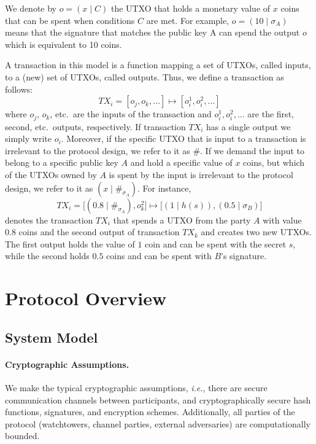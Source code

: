 \documentclass[runningheads]{llncs}
\newcommand{\ie}{{\em i.e.}}
\begin{document}
We denote by $o=(x \mid C)$
the UTXO that holds a monetary value of $x$ coins that can be spent when conditions $C$ are met. For example, $o=  (10 \mid \sigma_A)$ means that the signature that matches the public key A can spend the output $o$ which is equivalent to 10 coins.

A transaction in this model is a function mapping a set of UTXOs, called inputs, to a (new) set of UTXOs, called outputs.
Thus, we define a transaction as follows: 
$$TX_i= [o_j, o_k, \dots] \mapsto [o_i^1, o_i^2, \dots] $$
where $o_j$, $o_k$, etc.\ are the inputs of the transaction and $o_i^1, o_i^2, \dots $ are the first, second, etc.\ outputs, respectively.
If transaction $TX_i$ has a single output we simply write $o_i$.
Moreover, if the specific UTXO that is input to a transaction is irrelevant to the protocol design, we refer to it as ${\#}$. If we demand the input to belong to a specific public key $A$ and hold a specific value of $x$ coins, but which of the UTXOs owned by $A$ is spent by the input is irrelevant to the protocol design, we refer to it as $(x \mid {\#}_{\sigma_A})$.
For instance, 
$$TX_{i}= \big[(0.8 \mid {\#}_{\sigma_A}), o_k^2\big] \mapsto \big[(1 \mid h(s)), (0.5 \mid \sigma_B)\big]$$
denotes the transaction $TX_i$ that spends a UTXO from the party $A$ with value $0.8$ coins and the second output of transaction $TX_k$ and creates two new UTXOs. The first output holds the value of $1$ coin and can be spent with the secret $s$, while the second holds $0.5$ coins and can be spent with $B$'s signature.





\section{Protocol Overview}
\subsection{System Model}\label{subsec:model}

\paragraph{Cryptographic Assumptions.}
We make the typical cryptographic assumptions, \ie, there are secure communication channels between participants, and cryptographically secure hash functions, signatures, and encryption schemes. Additionally, all parties of the protocol (watchtowers, channel parties, external adversaries) are computationally bounded.
\end{document}
